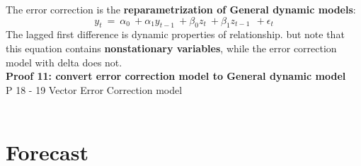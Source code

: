 \documentclass[12pt]{article}
\begin{document}
The error correction is the \textbf{reparametrization of General dynamic models}:
\begin{equation}
y_t\ =\ \alpha_0\ +\alpha_1y_{t-1}\ +\beta_0z_t\ +\beta_1z_{t-1}\ \ +\epsilon_t
\end{equation}
The lagged first difference is dynamic properties of relationship. but note that this equation contains \textbf{nonstationary variables}, while the error correction model with delta does not. \\
{\color{Tan} \textbf{Proof 11: convert error correction model to General dynamic model}}
\\


P 18 - 19 Vector Error Correction model
\\
\\

 
 
\newpage
{\color{RoyalBlue}
\section{Forecast}}
\end{document}
